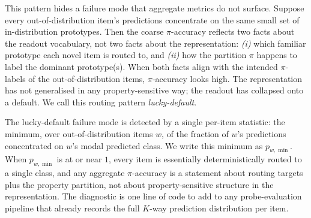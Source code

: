 \documentclass[11pt,letterpaper]{article}
\newcommand{\pwmin}{\texorpdfstring{\ensuremath{p_{w,\min}}}{p\_(w,min)}}
\begin{document}
This pattern hides a failure mode that aggregate metrics do not
surface. Suppose every out-of-distribution item's predictions
concentrate on the same small set of in-distribution prototypes.
Then the coarse $\pi$-accuracy reflects two facts about the readout
vocabulary, not two facts about the representation: \emph{(i)} which
familiar prototype each novel item is routed to, and \emph{(ii)} how
the partition $\pi$ happens to label the dominant prototype(s). When
both facts align with the intended $\pi$-labels of the
out-of-distribution items, $\pi$-accuracy looks high. The
representation has not generalised in any property-sensitive way; the
readout has collapsed onto a default. We call this routing pattern
\emph{lucky-default}.

The lucky-default failure mode is detected by a single per-item
statistic: the minimum, over out-of-distribution items $w$, of the
fraction of $w$'s predictions concentrated on $w$'s modal predicted
class. We write this minimum as \pwmin. When \pwmin{} is at or near
$1$, every item is essentially deterministically routed to a single
class, and any aggregate $\pi$-accuracy is a statement about routing
targets plus the property partition, not about property-sensitive
structure in the representation. The diagnostic is one line of code
to add to any probe-evaluation pipeline that already records the full
$K$-way prediction distribution per item.
\end{document}
